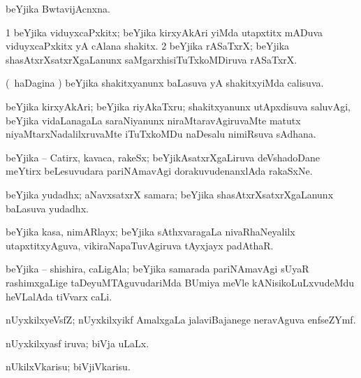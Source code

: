 \bentry
{}
\gl{\nA}
\bmng
beYjika BwtavijAcnxna. 
\emng
\eentry

\bentry
{}
\gl{\nA}
\bmng
\bnum
\num{1} beYjika viduyxcaPxkitx; beYjika kirxyAkAri yiMda utapxtitx mADuva viduyxcaPxkitx yA cAlana shakitx. 
\num{2} beYjika rASaTxrX; beYjika shasAtxrXsatxrXgaLanunx saMgarxhisiTuTxkoMDiruva rASaTxrX. 
\enum
\emng
\eentry

\bentry
{}
\gl{\gu}
\bmng
(\kanmu\ haDagina \vi) beYjika shakitxyanunx baLasuva yA shakitxyiMda calisuva. 
\emng
\eentry

\bentry
{}
\gl{\nA}
\bmng
beYjika kirxyAkAri; beYjika riyAkaTxru; shakitxyanunx utApxdisuva saluvAgi, beYjika vidaLanagaLa saraNiyanunx niraMtaravAgiruvaMte matutx niyaMtarxNadalilxruvaMte iTuTxkoMDu naDesalu nimiRsuva sAdhana. 
\emng
\eentry

\bentry
{}
\gl{\nA}
\bmng
beYjika -- Catirx, kavaca, rakeSx; beYjikAsatxrXgaLiruva deVshadoDane meYtirx beLesuvudara pariNAmavAgi dorakuvudenanxlAda rakaSxNe. 
\emng
\eentry

\bentry
{}
\gl{\nA}
\bmng
beYjika yudadhx; aNavxsatxrX samara; beYjika shasAtxrXsatxrXgaLanunx baLasuva yudadhx. 
\emng
\eentry

\bentry
{}
\gl{\nA}
\bmng
beYjika kasa, nimARlayx; beYjika sAthxvaragaLa nivaRhaNeyalilx utapxtitxyAguva, vikiraNapaTuvAgiruva tAyxjayx padAthaR. 
\emng
\eentry

\bentry
{}
\gl{\nA}
\bmng
beYjika -- shishira, caLigAla; beYjika samarada pariNAmavAgi sUyaR rashimxgaLige taDeyuMTAguvudariMda BUmiya meVle kANisikoLuLxvudeMdu heVLalAda tiVvarx caLi. 
\emng
\eentry

\bentry
{}
\gl{\nA}
\bmng
nUyxkilxyeVsfZ; nUyxkilxyikf AmalxgaLa jalaviBajanege neravAguva enfseZYmf. 
\emng
\eentry

\bentry
{}
\gl{\gu}
\bmng
nUyxkilxyasf iruva; biVja uLaLx. 
\emng
\eentry

\bentry
{}
\gl{\sakirx}
\bmng
nUkilxVkarisu; biVjiVkarisu. 
\emng

